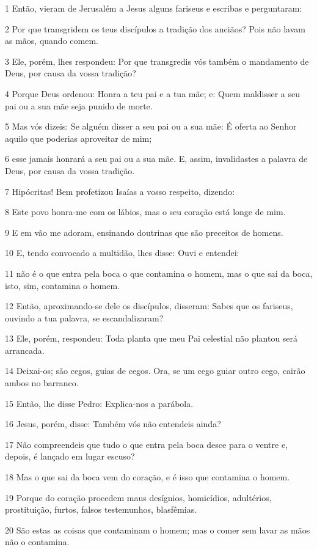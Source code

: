 \par 1 Então, vieram de Jerusalém a Jesus alguns fariseus e escribas e perguntaram:
\par 2 Por que transgridem os teus discípulos a tradição dos anciãos? Pois não lavam as mãos, quando comem.
\par 3 Ele, porém, lhes respondeu: Por que transgredis vós também o mandamento de Deus, por causa da vossa tradição?
\par 4 Porque Deus ordenou: Honra a teu pai e a tua mãe; e: Quem maldisser a seu pai ou a sua mãe seja punido de morte.
\par 5 Mas vós dizeis: Se alguém disser a seu pai ou a sua mãe: É oferta ao Senhor aquilo que poderias aproveitar de mim;
\par 6 esse jamais honrará a seu pai ou a sua mãe. E, assim, invalidastes a palavra de Deus, por causa da vossa tradição.
\par 7 Hipócritas! Bem profetizou Isaías a vosso respeito, dizendo:
\par 8 Este povo honra-me com os lábios, mas o seu coração está longe de mim.
\par 9 E em vão me adoram, ensinando doutrinas que são preceitos de homens.
\par 10 E, tendo convocado a multidão, lhes disse: Ouvi e entendei:
\par 11 não é o que entra pela boca o que contamina o homem, mas o que sai da boca, isto, sim, contamina o homem.
\par 12 Então, aproximando-se dele os discípulos, disseram: Sabes que os fariseus, ouvindo a tua palavra, se escandalizaram?
\par 13 Ele, porém, respondeu: Toda planta que meu Pai celestial não plantou será arrancada.
\par 14 Deixai-os; são cegos, guias de cegos. Ora, se um cego guiar outro cego, cairão ambos no barranco.
\par 15 Então, lhe disse Pedro: Explica-nos a parábola.
\par 16 Jesus, porém, disse: Também vós não entendeis ainda?
\par 17 Não compreendeis que tudo o que entra pela boca desce para o ventre e, depois, é lançado em lugar escuso?
\par 18 Mas o que sai da boca vem do coração, e é isso que contamina o homem.
\par 19 Porque do coração procedem maus desígnios, homicídios, adultérios, prostituição, furtos, falsos testemunhos, blasfêmias.
\par 20 São estas as coisas que contaminam o homem; mas o comer sem lavar as mãos não o contamina.

